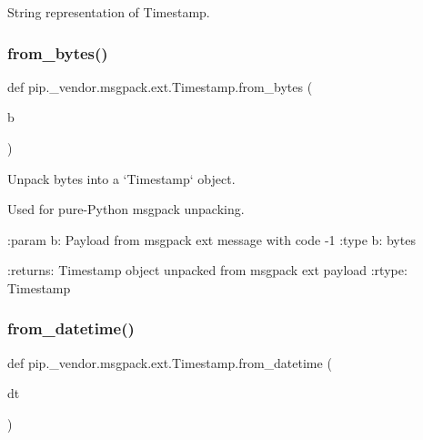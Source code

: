 \begin{DoxyVerb}String representation of Timestamp.\end{DoxyVerb}
 \mbox{\label{classpip_1_1__vendor_1_1msgpack_1_1ext_1_1Timestamp_a2550bdf0c1b253d92ad38772eabeb960}} 
\subsubsection{\texorpdfstring{from\+\_\+bytes()}{from\_bytes()}}
{\footnotesize\ttfamily def pip.\+\_\+vendor.\+msgpack.\+ext.\+Timestamp.\+from\+\_\+bytes (\begin{DoxyParamCaption}\item[{}]{b }\end{DoxyParamCaption})\hspace{0.3cm}{\ttfamily [static]}}

\begin{DoxyVerb}Unpack bytes into a `Timestamp` object.

Used for pure-Python msgpack unpacking.

:param b: Payload from msgpack ext message with code -1
:type b: bytes

:returns: Timestamp object unpacked from msgpack ext payload
:rtype: Timestamp
\end{DoxyVerb}
 \mbox{\label{classpip_1_1__vendor_1_1msgpack_1_1ext_1_1Timestamp_a8e9cf6bd29b3dca3d767dab3f914a3f6}} 
\subsubsection{\texorpdfstring{from\+\_\+datetime()}{from\_datetime()}}
{\footnotesize\ttfamily def pip.\+\_\+vendor.\+msgpack.\+ext.\+Timestamp.\+from\+\_\+datetime (\begin{DoxyParamCaption}\item[{}]{dt }\end{DoxyParamCaption})\hspace{0.3cm}{\ttfamily [static]}}

